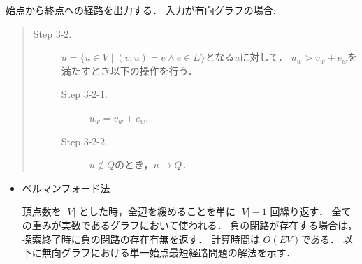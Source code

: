 \documentclass[12pt]{optlab-bachelor}
\begin{document}
始点から終点への経路を出力する．
入力が有向グラフの場合:
\begin{quote}
\begin{description}
\item[Step 3-2.] $u = \{ u \in V \mid (v,u) = e \land e \in E \}$となる$u$に対して，
$u_w > v_w + e_w$を満たすとき以下の操作を行う．
\begin{description}
  \item[Step 3-2-1.] $u_w = v_w + e_w$.
  \item[Step 3-2-2.] $u \notin Q$のとき，$u \rightarrow Q$．
\end{description}
\end{description}
\end{quote}

\begin{itemize}
  \item ベルマンフォード法

  頂点数を $|V|$ とした時，全辺を緩めることを単に $|V|-1$ 回繰り返す．
  全ての重みが実数であるグラフにおいて使われる．
  負の閉路が存在する場合は，探索終了時に負の閉路の存在有無を返す．
  計算時間は $O(EV)$である．
  以下に無向グラフにおける単一始点最短経路問題の解法を示す．


\end{itemize}
\end{document}
